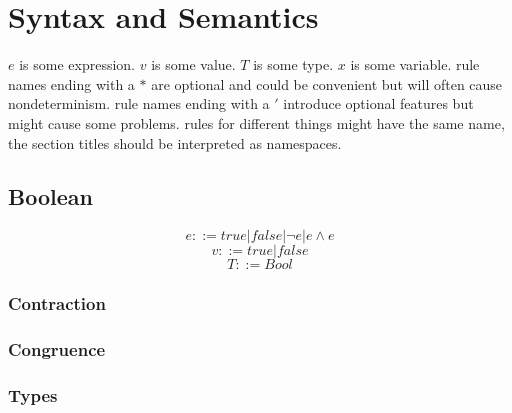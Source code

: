 \documentclass[10pt,a4paper]{article}
\begin{document}
\tableofcontents

\section{Syntax and Semantics}
$e$ is some expression.
$v$ is some value.
$T$ is some type.
$x$ is some variable.
rule names ending with a $*$ are optional and could be convenient but will often cause nondeterminism.
rule names ending with a $'$ introduce optional features but might cause some problems.
rules for different things might have the same name,
the section titles should be interpreted as namespaces.



\subsection{Boolean}
\[e ::= true | false | ¬ e | e ∧ e\]
\[v ::= true | false\]
\[T ::= Bool\]
\subsubsection{Contraction}

 \vspace{1em}
 \vspace{1em}
 \vspace{1em}
 \vspace{1em}
 \vspace{1em}
 \vspace{1em}

\subsubsection{Congruence}
 \vspace{1em}
 \vspace{1em}
 \vspace{1em}

\subsubsection{Types}
  \vspace{1em}
 \vspace{1em}
 \vspace{1em}
 \vspace{1em}
\end{document}

